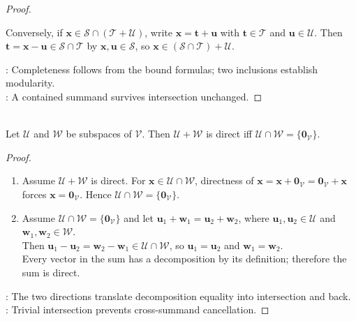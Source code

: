 \begin{theorem}
\begin{proof}
\begin{enumerate}[label=(\roman*)]
Conversely, if $\mathbf{x}\in\mathcal{S}\cap(\mathcal{T}+\mathcal{U})$, write $\mathbf{x}=\mathbf{t}+\mathbf{u}$ with $\mathbf{t}\in\mathcal{T}$ and $\mathbf{u}\in\mathcal{U}$. Then $\mathbf{t}=\mathbf{x}-\mathbf{u}\in\mathcal{S}\cap\mathcal{T}$ by $\mathbf{x},\mathbf{u}\in\mathcal{S}$, so $\mathbf{x}\in(\mathcal{S}\cap\mathcal{T})+\mathcal{U}$.
\end{enumerate}
: Completeness follows from the bound formulas; two inclusions establish modularity.\\
: A contained summand survives intersection unchanged.
\end{proof}
\end{theorem}

\begin{proposition} \label{prop:uniqueness-direct-sum-two-subspaces} \\
Let $\mathcal{U}$ and $\mathcal{W}$ be subspaces of $\mathcal{V}$. Then $\mathcal{U}+\mathcal{W}$ is direct iff $\mathcal{U}\cap\mathcal{W}=\{\mathbf{0}_{\mathcal{V}}\}$.
\begin{proof}
\begin{enumerate}[label=\roman*.]
\setlength{\itemsep}{0pt}
\item[$(\Rightarrow)$] Assume $\mathcal{U}+\mathcal{W}$ is direct. For $\mathbf{x}\in\mathcal{U}\cap\mathcal{W}$, directness of $\mathbf{x}=\mathbf{x}+\mathbf{0}_{\mathcal{V}}=\mathbf{0}_{\mathcal{V}}+\mathbf{x}$ forces $\mathbf{x}=\mathbf{0}_{\mathcal{V}}$. Hence $\mathcal{U}\cap\mathcal{W}=\{\mathbf{0}_{\mathcal{V}}\}$.
\item[$(\Leftarrow)$] Assume $\mathcal{U}\cap\mathcal{W}=\{\mathbf{0}_{\mathcal{V}}\}$ and let $\mathbf{u}_1+\mathbf{w}_1=\mathbf{u}_2+\mathbf{w}_2$, where $\mathbf{u}_1,\mathbf{u}_2\in\mathcal{U}$ and $\mathbf{w}_1,\mathbf{w}_2\in\mathcal{W}$.\\
Then $\mathbf{u}_1-\mathbf{u}_2=\mathbf{w}_2-\mathbf{w}_1\in\mathcal{U}\cap\mathcal{W}$, so $\mathbf{u}_1=\mathbf{u}_2$ and $\mathbf{w}_1=\mathbf{w}_2$.\\
Every vector in the sum has a decomposition by its definition; therefore the sum is direct.
\end{enumerate}
: The two directions translate decomposition equality into intersection and back.\\
: Trivial intersection prevents cross-summand cancellation.
\end{proof}
\end{proposition}

